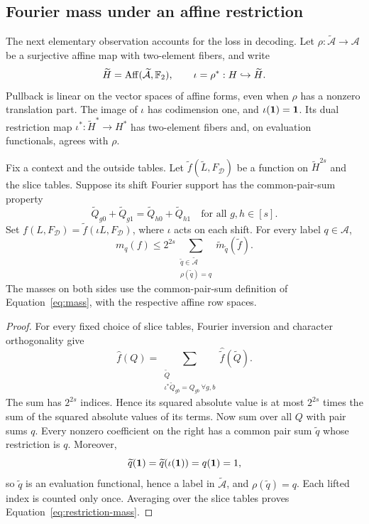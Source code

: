 \subsection{Fourier mass under an affine restriction}

The next elementary observation accounts for the loss in decoding.
Let $\rho:\widetilde{\mathcal A}\to\mathcal A$ be a surjective affine
map with two-element fibers, and write
\[
 \widetilde H=\operatorname{Aff}(\widetilde{\mathcal A},\mathbb F_2),\qquad
 \iota=\rho^*:H\hookrightarrow\widetilde H.
\]
Pullback is linear on the vector spaces of affine forms, even when
$\rho$ has a nonzero translation part.  The image of $\iota$ has
codimension one, and $\iota(\mathbf 1)=\mathbf 1$.
Its dual restriction map
$\iota^*:\widetilde H^*\to H^*$ has two-element fibers and, on
evaluation functionals, agrees with $\rho$.

\begin{lemma}\label{lem:restriction}
Fix a context and the outside tables.  Let
$\widetilde f(\widetilde L,F_{\mathcal D})$ be a function on
$\widetilde H^{2s}$ and the slice tables.  Suppose its shift Fourier
support has the common-pair-sum property
\[
 \widetilde Q_{g0}+\widetilde Q_{g1}
 =\widetilde Q_{h0}+\widetilde Q_{h1}
 \quad\text{for all }g,h\in[s].
\]
Set $f(L,F_{\mathcal D})=
\widetilde f(\iota L,F_{\mathcal D})$, where $\iota$ acts on each
shift.  For every label $q\in\mathcal A$,
\begin{equation}\label{eq:restriction-mass}
 m_q(f)\leq 2^{2s}
       \sum_{\substack{\widetilde q\in\widetilde{\mathcal A}\\
                       \rho(\widetilde q)=q}}
          \widetilde m_{\widetilde q}(\widetilde f).
\end{equation}
The masses on both sides use the common-pair-sum definition of
Equation~\eqref{eq:mass}, with the respective affine row spaces.
\end{lemma}

\begin{proof}
For every fixed choice of slice tables, Fourier inversion and
character orthogonality give
\[
 \widehat f(Q)=
 \sum_{\substack{\widetilde Q\\
                  \iota^*\widetilde Q_{gb}=Q_{gb}\ \forall g,b}}
       \widehat{\widetilde f}(\widetilde Q).
\]
The sum has $2^{2s}$ indices.  Hence its squared absolute value is at
most $2^{2s}$ times the sum of the squared absolute values of its
terms.  Now sum over all $Q$ with pair sums $q$.  Every nonzero
coefficient on the right has a common pair sum $\widetilde q$ whose
restriction is $q$.  Moreover,
\[
 \widetilde q(\mathbf 1)=\widetilde q(\iota(\mathbf 1))=q(\mathbf 1)=1,
\]
so $\widetilde q$ is an evaluation functional, hence a label in
$\widetilde{\mathcal A}$, and $\rho(\widetilde q)=q$.
Each lifted index is counted only once.  Averaging over the slice
tables proves Equation~\eqref{eq:restriction-mass}.
\end{proof}

